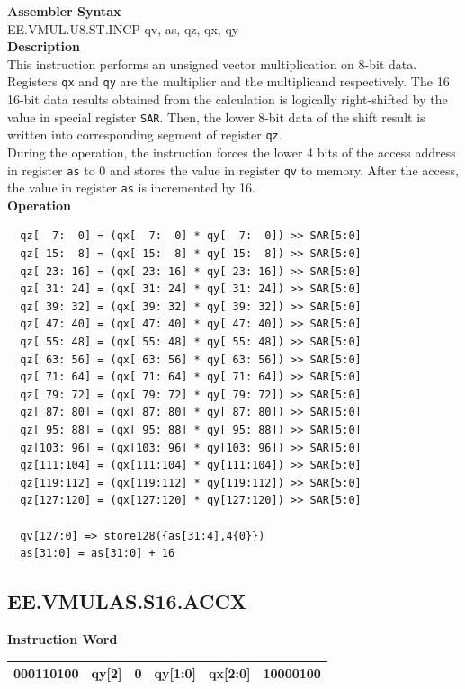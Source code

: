 \textbf{Assembler Syntax} \\
EE.VMUL.U8.ST.INCP qv, as, qz, qx, qy \\
\textbf{Description} \\
This instruction performs an unsigned vector multiplication on 8-bit data. Registers \lstinline{qx} and \lstinline{qy} are the multiplier and the multiplicand respectively. The 16 16-bit data results obtained from the calculation is logically right-shifted by the value in special register \lstinline{SAR}. Then, the lower 8-bit data of the shift result is written into corresponding segment of register \lstinline{qz}. \\ During the operation, the instruction forces the lower 4 bits of the access address in register \lstinline{as} to 0 and stores the value in register \lstinline{qv} to memory. After the access, the value in register \lstinline{as} is incremented by 16.\\
\textbf{Operation}
\begin{lstlisting}
  qz[  7:  0] = (qx[  7:  0] * qy[  7:  0]) >> SAR[5:0]
  qz[ 15:  8] = (qx[ 15:  8] * qy[ 15:  8]) >> SAR[5:0]
  qz[ 23: 16] = (qx[ 23: 16] * qy[ 23: 16]) >> SAR[5:0]
  qz[ 31: 24] = (qx[ 31: 24] * qy[ 31: 24]) >> SAR[5:0]
  qz[ 39: 32] = (qx[ 39: 32] * qy[ 39: 32]) >> SAR[5:0]
  qz[ 47: 40] = (qx[ 47: 40] * qy[ 47: 40]) >> SAR[5:0]
  qz[ 55: 48] = (qx[ 55: 48] * qy[ 55: 48]) >> SAR[5:0]
  qz[ 63: 56] = (qx[ 63: 56] * qy[ 63: 56]) >> SAR[5:0]
  qz[ 71: 64] = (qx[ 71: 64] * qy[ 71: 64]) >> SAR[5:0]
  qz[ 79: 72] = (qx[ 79: 72] * qy[ 79: 72]) >> SAR[5:0]
  qz[ 87: 80] = (qx[ 87: 80] * qy[ 87: 80]) >> SAR[5:0]
  qz[ 95: 88] = (qx[ 95: 88] * qy[ 95: 88]) >> SAR[5:0]
  qz[103: 96] = (qx[103: 96] * qy[103: 96]) >> SAR[5:0]
  qz[111:104] = (qx[111:104] * qy[111:104]) >> SAR[5:0]
  qz[119:112] = (qx[119:112] * qy[119:112]) >> SAR[5:0]
  qz[127:120] = (qx[127:120] * qy[127:120]) >> SAR[5:0]

  qv[127:0] => store128({as[31:4],4{0}})
  as[31:0] = as[31:0] + 16
\end{lstlisting}

\clearpage
\subsection{EE.VMULAS.S16.ACCX}\label{instruction:EEVMULASS16ACCX}
\setlength\tabcolsep{6pt}
\textbf{Instruction Word} \\
\begin{tabular}{|c|c|c|c|c|c|}
	\hline
	000110100 & qy[2] & 0 & qy[1:0] & qx[2:0] & 10000100 \\
	\hline
\end{tabular}

